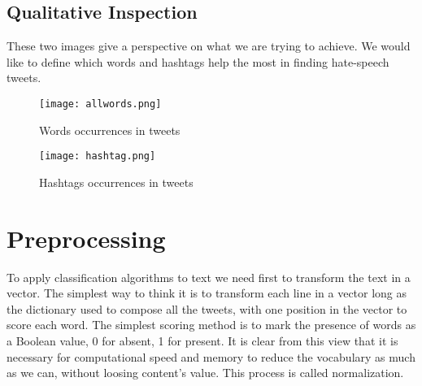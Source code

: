 \documentclass[12pt]{article}
\begin{document}
\subsection{Qualitative Inspection}
These two images give a perspective on what we are trying to achieve. We would like to define which words and hashtags help the most in finding hate-speech tweets.
\begin{figure}[h]
\centering
\texttt{[image: allwords.png]}
\caption{Words occurrences in tweets}
\label{Words}
\end{figure}

\begin{figure}[h!]
\centering
\texttt{[image: hashtag.png]}
\caption{Hashtags occurrences in tweets}
\end{figure}
\section{Preprocessing}
To apply classification algorithms to text we need first to transform the text in a vector. The simplest way to think it is to transform each line in a vector long as the dictionary used to compose all the tweets, with one position in the vector to score each word. The simplest scoring method is to mark the presence of words as a Boolean value, 0 for absent, 1 for present.
It is clear from this view that it is necessary for computational speed and memory to reduce the vocabulary as much as we can, without loosing content's value.\newline
This process is called normalization.
\end{document}
